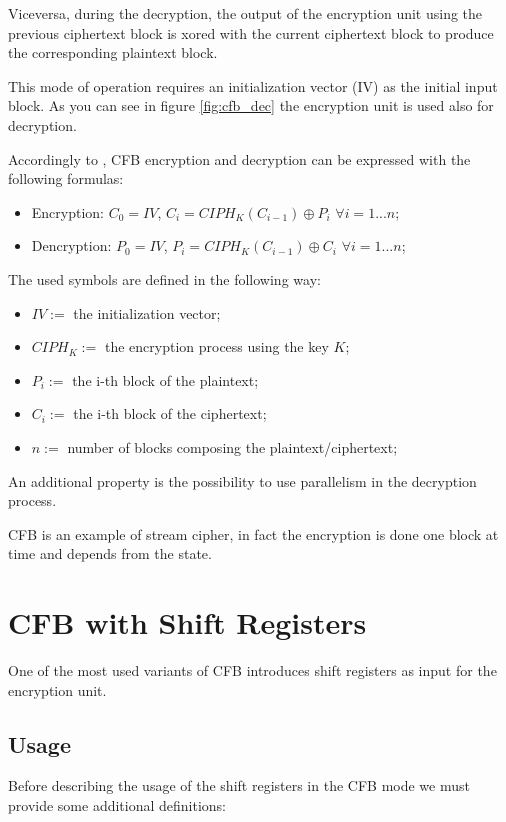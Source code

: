 \documentclass[11pt]{article}
\newcommand\CIPH{C\!I\!P\!H_K}
\begin{document}
Viceversa, during the decryption, the output of the encryption unit using the previous ciphertext block is xored with the current ciphertext block to produce the corresponding plaintext block.

This mode of operation requires an initialization vector (IV) as the initial input block. As you can see in figure \ref{fig:cfb_dec} the encryption unit is used also for decryption.

Accordingly to \cite{wiki}, CFB encryption and decryption can be expressed with the following formulas:

\begin{itemize}
\item Encryption: $C_0 = IV$, $C_i = \CIPH(C_{i-1}) \oplus P_i$ $\forall i = 1...n$;
\item Dencryption: $P_0 = IV$, $P_i = \CIPH(C_{i-1}) \oplus C_i$ $\forall i = 1...n$;
\end{itemize}

The used symbols are defined in the following way:

\begin{itemize}
\item $IV := $ the initialization vector;
\item $\CIPH := $ the encryption process using the key $K$;
\item $P_i := $ the i-th block of the plaintext;
\item $C_i := $ the i-th block of the ciphertext;
\item $n := $ number of blocks composing the plaintext/ciphertext;
\end{itemize}

An additional property is the possibility to use parallelism in the decryption process. 

CFB is an example of stream cipher, in fact the encryption is done one block at time and depends from the state. 

\section{CFB with Shift Registers}

One of the most used variants of CFB introduces shift registers as input for the encryption unit.

\subsection{Usage}

Before describing the usage of the shift registers in the CFB mode we must provide some additional definitions:
\end{document}
